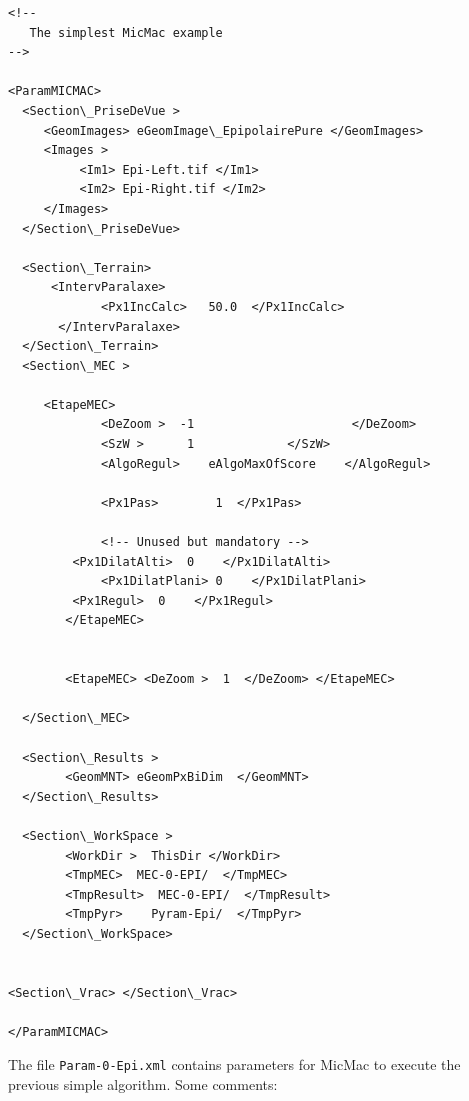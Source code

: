 {\scriptsize
\setlength{\columnseprule}{0.5pt}
\begin{multicols}{2}
\begin{verbatim}
<!--
   The simplest MicMac example
-->

<ParamMICMAC>
  <Section\_PriseDeVue >
     <GeomImages> eGeomImage\_EpipolairePure </GeomImages>
     <Images >
          <Im1> Epi-Left.tif </Im1>
          <Im2> Epi-Right.tif </Im2>
     </Images>
  </Section\_PriseDeVue>

  <Section\_Terrain>  
      <IntervParalaxe>
             <Px1IncCalc>   50.0  </Px1IncCalc>
       </IntervParalaxe>
  </Section\_Terrain>
  <Section\_MEC >

	 <EtapeMEC>
             <DeZoom >  -1                      </DeZoom>
             <SzW >      1             </SzW>
             <AlgoRegul>    eAlgoMaxOfScore    </AlgoRegul>

             <Px1Pas>        1  </Px1Pas>

             <!-- Unused but mandatory -->
	     <Px1DilatAlti>  0    </Px1DilatAlti>
             <Px1DilatPlani> 0    </Px1DilatPlani>
	     <Px1Regul>  0    </Px1Regul>
        </EtapeMEC>
	     

        <EtapeMEC> <DeZoom >  1  </DeZoom> </EtapeMEC>

  </Section\_MEC>

  <Section\_Results >
        <GeomMNT> eGeomPxBiDim  </GeomMNT> 
  </Section\_Results>

  <Section\_WorkSpace >
        <WorkDir >  ThisDir </WorkDir> 
        <TmpMEC>  MEC-0-EPI/  </TmpMEC>
        <TmpResult>  MEC-0-EPI/  </TmpResult>
        <TmpPyr>    Pyram-Epi/  </TmpPyr>
  </Section\_WorkSpace>


<Section\_Vrac> </Section\_Vrac>

</ParamMICMAC>
\end{verbatim}
\end{multicols}
}

The file {\tt Param-0-Epi.xml} contains parameters for MicMac  to execute
the previous simple algorithm. Some comments:

